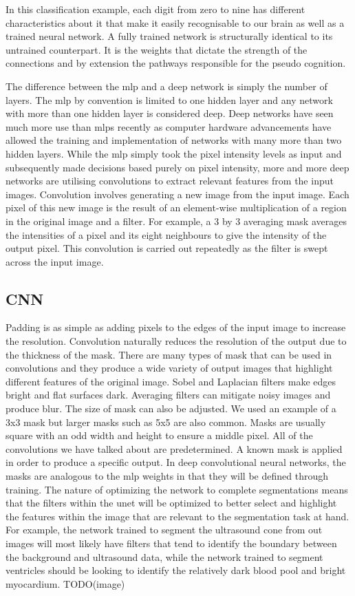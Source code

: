 \documentclass[12pt]{article}
\begin{document}
In this classification example, each digit from zero to nine has different characteristics about it that make it easily recognisable to our brain as well as a trained neural network.
A fully trained network is structurally identical to its untrained counterpart. It is the weights that dictate the strength of the connections and by extension the pathways responsible for the pseudo cognition.
\par
The difference between the mlp and a deep network is simply the number of layers.
The mlp by convention is limited to one hidden layer and any network with more than one hidden layer is considered deep.
Deep networks have seen much more use than mlps recently as computer hardware advancements have allowed the training and implementation of networks with many more than two hidden layers.
While the mlp simply took the pixel intensity levels as input and subsequently made decisions based purely on pixel intensity, more and more deep networks are utilising convolutions to extract relevant features from the input images.
Convolution involves generating a new image from the input image. Each pixel of this new image is the result of an element-wise multiplication of a region in the original image and a filter.
For example, a 3 by 3 averaging mask averages the intensities of a pixel and its eight neighbours to give the intensity of the output pixel.
This convolution is carried out repeatedly as the filter is swept across the input image.

\subsection{CNN}
\par
Padding is as simple as adding pixels to the edges of the input image to increase the resolution.
Convolution naturally reduces the resolution of the output due to the thickness of the mask.
There are many types of mask that can be used in convolutions and they produce a wide variety of output images that highlight different features of the original image.
Sobel and Laplacian filters make edges bright and flat surfaces dark. Averaging filters can mitigate noisy images and produce blur.
The size of mask can also be adjusted. We used an example of a 3x3 mask but larger masks such as 5x5 are also common.
Masks are usually square with an odd width and height to ensure a middle pixel. All of the convolutions we have talked about are predetermined.
A known mask is applied in order to produce a specific output. In deep convolutional neural networks, the masks are analogous to the mlp weights in that they will be defined through training.
The nature of optimizing the network to complete segmentations means that the filters within the unet will be optimized to better select and highlight the features within the image that are relevant to the segmentation task at hand.
For example, the network trained to segment the ultrasound cone from out images will most likely have filters that tend to identify the boundary between the background and ultrasound data,
while the network trained to segment ventricles should be looking to identify the relatively dark blood pool and bright myocardium.
TODO(image)
\end{document}
